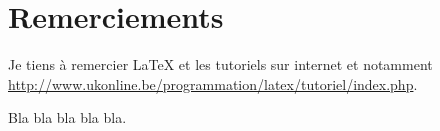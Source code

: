 \part*{Remerciements}

Je tiens à remercier \LaTeX{} et les tutoriels sur internet et notamment \url{http://www.ukonline.be/programmation/latex/tutoriel/index.php}.

Bla bla bla bla bla.
